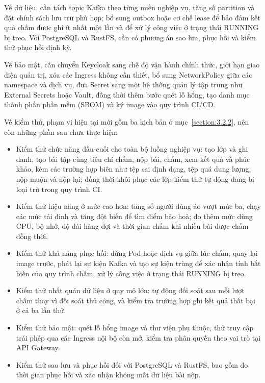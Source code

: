 \documentclass[../BTL.tex]{subfiles}
\begin{document}
Về dữ liệu, cần tách topic Kafka theo từng miền nghiệp vụ, tăng số partition và đặt chính sách lưu trữ phù hợp; bổ sung outbox hoặc cơ chế lease để bảo đảm kết quả chấm được ghi ít nhất một lần và để xử lý công việc ở trạng thái RUNNING bị treo. Với PostgreSQL và RustFS, cần có phương án sao lưu, phục hồi và kiểm thử phục hồi định kỳ.

Về bảo mật, cần chuyển Keycloak sang chế độ vận hành chính thức, giới hạn giao diện quản trị, xóa các Ingress không cần thiết, bổ sung NetworkPolicy giữa các namespace và dịch vụ, đưa Secret sang một hệ thống quản lý tập trung như External Secrets hoặc Vault, đồng thời thêm bước quét lỗ hổng, tạo danh mục thành phần phần mềm (SBOM) và ký image vào quy trình CI/CD.

Về kiểm thử, phạm vi hiện tại mới gồm ba kịch bản ở mục~\ref{section:3.2.2}, nên còn những phần sau chưa thực hiện:

\begin{itemize}
    \item Kiểm thử chức năng đầu-cuối cho toàn bộ luồng nghiệp vụ: tạo lớp và ghi danh, tạo bài tập cùng tiêu chí chấm, nộp bài, chấm, xem kết quả và phúc khảo, kèm các trường hợp biên như tệp sai định dạng, tệp quá dung lượng, nộp muộn và nộp lại; đồng thời khôi phục các lớp kiểm thử tự động đang bị loại trừ trong quy trình CI.
    \item Kiểm thử hiệu năng ở mức cao hơn: tăng số người dùng ảo vượt mức ba, chạy các mức tải đỉnh và tăng đột biến để tìm điểm bão hoà; đo thêm mức dùng CPU, bộ nhớ, độ dài hàng đợi và thời gian chấm khi nhiều bài được chấm đồng thời.
    \item Kiểm thử khả năng phục hồi: dừng Pod hoặc dịch vụ giữa lúc chấm, quay lại image trước, phát lại sự kiện Kafka và tạo sự kiện trùng để xác nhận tính bất biến của quy trình chấm, xử lý công việc ở trạng thái RUNNING bị treo.
    \item Kiểm thử nhất quán dữ liệu ở quy mô lớn: tự động đối soát sau mỗi lượt chấm thay vì đối soát thủ công, và kiểm tra trường hợp ghi kết quả thất bại ở cả ba lần thử.
    \item Kiểm thử bảo mật: quét lỗ hổng image và thư viện phụ thuộc, thử truy cập trái phép qua các Ingress nội bộ còn mở, kiểm tra phân quyền theo vai trò tại API Gateway.
    \item Kiểm thử sao lưu và phục hồi đối với PostgreSQL và RustFS, bao gồm đo thời gian phục hồi và xác nhận không mất dữ liệu bài nộp.
\end{itemize}
\end{document}
